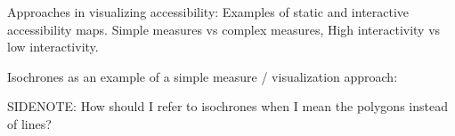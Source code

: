 Approaches in visualizing accessibility:
Examples of static and interactive accessibility maps.
Simple measures vs complex measures,
High interactivity vs low interactivity.

Isochrones as an example of a simple measure / visualization approach:


SIDENOTE: How should I refer to isochrones when I mean the polygons instead of lines?



